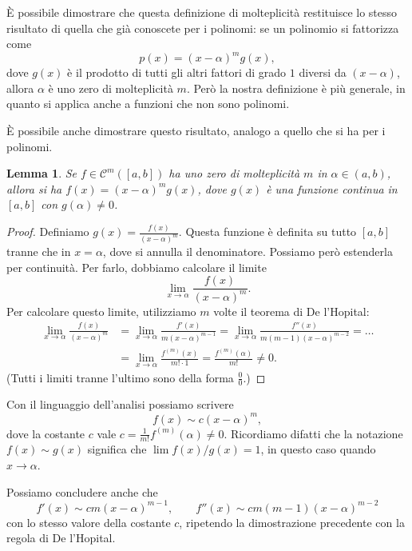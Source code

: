 \documentclass[a4paper]{report}
\newtheorem{lemma}[theorem]{Lemma}
\theoremstyle{definiton}
\theoremstyle{remark}
\begin{document}
È possibile dimostrare che questa definizione di molteplicità restituisce lo stesso risultato di quella che già conoscete per i polinomi: se un polinomio si fattorizza come
\[
    p(x) = (x-\alpha)^m g(x),
\]
dove $g(x)$ è il prodotto di tutti gli altri fattori di grado $1$ diversi da $(x-\alpha)$, allora $\alpha$ è uno zero di molteplicità $m$. Però la nostra definizione è più generale, in quanto si applica anche a funzioni che non sono polinomi.

È possibile anche dimostrare questo risultato, analogo a quello che si ha per i polinomi.
\begin{lemma}
Se $f\in\mathcal{C}^m([a,b])$ ha uno zero di molteplicità $m$ in $\alpha \in (a,b)$, allora si ha $f(x) = (x-\alpha)^m g(x)$, dove $g(x)$ è una funzione continua in $[a,b]$ con $g(\alpha) \neq 0$.
\end{lemma}
\begin{proof}
Definiamo $g(x) = \frac{f(x)}{(x-\alpha)^m}$. Questa funzione è definita su tutto $[a,b]$ tranne che in $x=\alpha$, dove si annulla il denominatore. Possiamo però estenderla per continuità. Per farlo, dobbiamo calcolare il limite
\[
\lim_{x\to \alpha} \frac{f(x)}{(x-\alpha)^m}.
\]
Per calcolare questo limite, utilizziamo $m$ volte il teorema di De l'Hopital: 
\begin{align*}
\lim_{x\to \alpha} \frac{f(x)}{(x-\alpha)^m} &= \lim_{x\to \alpha} \frac{f'(x)}{m(x-\alpha)^{m-1}} = \lim_{x\to \alpha} \frac{f''(x)}{m(m-1)(x-\alpha)^{m-2}} = \dots \\
&= \lim_{x\to \alpha} \frac{f^{(m)}(x)}{m!\cdot 1} = \frac{f^{(m)}(\alpha)}{m!} \neq 0.
\end{align*}
(Tutti i limiti tranne l'ultimo sono della forma $\frac{0}{0}$.)
\end{proof}


Con il linguaggio dell'analisi possiamo scrivere
\[
    f(x) \sim c (x-\alpha)^m,
\]
dove la costante $c$ vale $c= \frac{1}{m!}f^{(m)}(\alpha) \neq 0$. Ricordiamo difatti che la notazione $f(x) \sim g(x)$ significa che $\lim f(x) / g(x) = 1$, in questo caso quando $x\to \alpha$.

Possiamo concludere anche che
\begin{equation} \label{lhopder}
    f'(x) \sim cm (x-\alpha)^{m-1}, \quad \quad f''(x) \sim cm(m-1)(x-\alpha)^{m-2}
\end{equation} 
con lo stesso valore della costante $c$, ripetendo la dimostrazione precedente con la regola di De l'Hopital.
\end{document}
